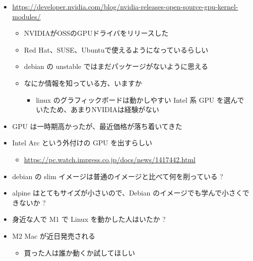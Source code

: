 \documentclass[mingoth,a4paper]{jsarticle}
\begin{document}

\begin{itemize}
\item \url{https://developer.nvidia.com/blog/nvidia-releases-open-source-gpu-kernel-modules/}
  \begin{itemize}
  \item NVIDIAがOSSのGPUドライバをリリースした
  \item Red Hat、SUSE、Ubuntuで使えるようになっているらしい
  \item debian の unstable ではまだパッケージがないように思える
  \item なにか情報を知っている方、いますか
    \begin{itemize}
    \item linux のグラフィックボードは動かしやすい Intel 系 GPU を選んでいたため、あまりNVIDIAは経験がない
    \end{itemize}
  \end{itemize}
\end{itemize}



\begin{itemize}
\item GPU は一時期高かったが、最近価格が落ち着いてきた
\item Intel Arc という外付けの GPU を出すらしい
  \begin{itemize}
  \item \url{https://pc.watch.impress.co.jp/docs/news/1417442.html}
  \end{itemize}
\end{itemize}



\begin{itemize}
\item debian の slim イメージは普通のイメージと比べて何を削っている ?
\item alpine はとてもサイズが小さいので、Debian のイメージでも学んで小さくできないか ?
\end{itemize}



\begin{itemize}
\item 身近な人で M1 で Linux を動かした人はいたか ?
\item M2 Mac が近日発売される
  \begin{itemize}
  \item 買った人は誰か動くか試してほしい
  \end{itemize}
\end{itemize}
\end{document}
